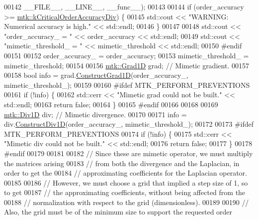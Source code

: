 \begin{DoxyCode}
00142                       \_\_FILE\_\_, \_\_LINE\_\_, \_\_func\_\_);
00143 
00144   \textcolor{keywordflow}{if} (order\_accuracy >= \hyperlink{group__c01-roots_ga0898eef2108473e44a5223932d571c31}{mtk::kCriticalOrderAccuracyDiv}) \{
00145     std::cout << \textcolor{stringliteral}{"WARNING: Numerical accuracy is high."} << std::endl;
00146   \}
00147 
00148   std::cout << \textcolor{stringliteral}{"order\_accuracy\_ = "} << order\_accuracy << std::endl;
00149   std::cout << \textcolor{stringliteral}{"mimetic\_threshold\_ = "} << mimetic\_threshold << std::endl;
00150 \textcolor{preprocessor}{  #endif}
00151 
00152   order\_accuracy\_ = order\_accuracy;
00153   mimetic\_threshold\_ = mimetic\_threshold;
00154 
00156   \hyperlink{classmtk_1_1Grad1D}{mtk::Grad1D} grad; \textcolor{comment}{// Mimetic gradient.}
00157 
00158   \textcolor{keywordtype}{bool} info = grad.\hyperlink{classmtk_1_1Grad1D_a74ef5245cfae6fd158bd7f563a0c2e52}{ConstructGrad1D}(order\_accuracy\_, mimetic\_threshold\_);
00159 
00160 \textcolor{preprocessor}{  #ifdef MTK\_PERFORM\_PREVENTIONS}
00161   \textcolor{keywordflow}{if} (!info) \{
00162     std::cerr << \textcolor{stringliteral}{"Mimetic grad could not be built."} << std::endl;
00163     \textcolor{keywordflow}{return} \textcolor{keyword}{false};
00164   \}
00165 \textcolor{preprocessor}{  #endif}
00166 
00168 
00169   \hyperlink{classmtk_1_1Div1D}{mtk::Div1D} div; \textcolor{comment}{// Mimetic divergence.}
00170 
00171   info = div.\hyperlink{classmtk_1_1Div1D_a52fcd1542f11e606e36bd188e48bfdf7}{ConstructDiv1D}(order\_accuracy\_, mimetic\_threshold\_);
00172 
00173 \textcolor{preprocessor}{  #ifdef MTK\_PERFORM\_PREVENTIONS}
00174   \textcolor{keywordflow}{if} (!info) \{
00175     std::cerr << \textcolor{stringliteral}{"Mimetic div could not be built."} << std::endl;
00176     \textcolor{keywordflow}{return} \textcolor{keyword}{false};
00177   \}
00178 \textcolor{preprocessor}{  #endif}
00179 
00181 
00182   \textcolor{comment}{// Since these are mimetic operator, we must multiply the matrices arising}
00183   \textcolor{comment}{// from both the divergence and the Laplacian, in order to get the}
00184   \textcolor{comment}{// approximating coefficients for the Laplacian operator.}
00185 
00186   \textcolor{comment}{// However, we must choose a grid that implied a step size of 1, so to get}
00187   \textcolor{comment}{// the approximating coefficients, without being affected from the}
00188   \textcolor{comment}{// normalization with respect to the grid (dimensionless).}
00189 
00190   \textcolor{comment}{// Also, the grid must be of the minimum size to support the requested order}

\end{DoxyCode}
